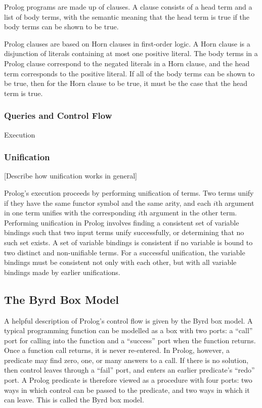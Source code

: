 \documentclass[12pt]{article}
\begin{document}
Prolog programs are made up of clauses. 
A clause consists of a head term and a list of body terms, with the semantic meaning that the head term is true if the body terms can be shown to be true. 

Prolog clauses are based on Horn clauses in first-order logic. 
A Horn clause is a disjunction of literals containing at most one positive literal. 
The body terms in a Prolog clause correspond to the negated literals in a Horn clause, and the head term corresponds to the positive literal. 
If all of the body terms can be shown to be true, then for the Horn clause to be true, it must be the case that the head term is true. 

\subsubsection{Queries and Control Flow}

Execution 

\subsubsection{Unification}

[Describe how unification works in general]

Prolog's execution proceeds by performing unification of terms. Two terms unify if they have the same functor symbol and the same arity, and each $i$th argument in one term unifies with the corresponding $i$th argument in the other term. Performing unification in Prolog involves finding a consistent set of variable bindings such that two input terms unify successfully, or determining that no such set exists. A set of variable bindings is consistent if no variable is bound to two distinct and non-unifiable terms. For a successful unification, the variable bindings must be consistent not only with each other, but with all variable bindings made by earlier unifications.

\subsection{The Byrd Box Model}


A helpful description of Prolog's control flow is given by the Byrd box model. 
A typical programming function can be modelled as a box with two ports: a ``call'' port for calling into the function and a ``success'' port when the function returns. 
Once a function call returns, it is never re-entered.
In Prolog, however, a predicate may find zero, one, or many answers to a call. 
If there is no solution, then control leaves through a ``fail'' port, and enters an earlier predicate's ``redo'' port.
A Prolog predicate is therefore viewed as a procedure with four ports: two ways in which control can be passed to the predicate, and two ways in which it can leave.
This is called the Byrd box model.
\end{document}
